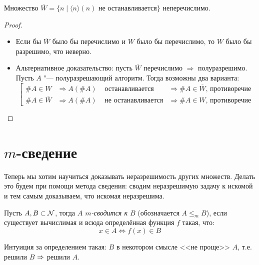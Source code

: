 \begin{conseq}
	 Множество $\overline{W} = \{n \mid \langle n\rangle(n)\text{~не останавливается}\}$ неперечислимо.
\end{conseq}
\begin{proof}
	\begin{itemize}
		\item
			Если бы $\overline{W}$ было бы перечислимо и $W$ было бы перечислимо, то $W$ было бы разрешимо, что неверно.
		\item
			Альтернативное доказательство: пусть $\overline{W}$ перечислимо $\Rightarrow$ полуразрешимо.
			Пусть $A$ "--- полуразрешающий алгоритм.
			Тогда возможны два варианта:
			\[\left[
				\begin{alignedat}{2}
				\#A \in W            &\Rightarrow A(\#A) &\text{~останавливается}    &\Rightarrow \#A \in \overline{W}\text{, противоречие} \\
				\#A \in \overline{W} &\Rightarrow A(\#A) &\text{~не останавливается} &\Rightarrow \#A \in W           \text{, противоречие}
				\end{alignedat}
			\right.\]
	\end{itemize}
\end{proof}

\section{$m$-сведение}
Теперь мы хотим научиться доказывать неразрешимость других множеств.
Делать это будем при помощи метода сведения: сводим неразрешимую задачу к искомой и тем самым доказываем, что искомая неразрешима.

\begin{Def}
	Пусть $A, B \subset \mathcal{N}$, тогда \textit{$A$ $m$-сводится к $B$} (обозначается $A \le_m B$),
	если существует вычислимая и всюда определённая функция $f$ такая, что:
	\[ x \in A \iff f(x) \in B \]
\end{Def}
\begin{Rem}
	Интуиция за определением такая: $B$ в некотором смысле <<не проще>> $A$, т.е. решили $B$ $\Rightarrow$ решили $A$.
\end{Rem}

